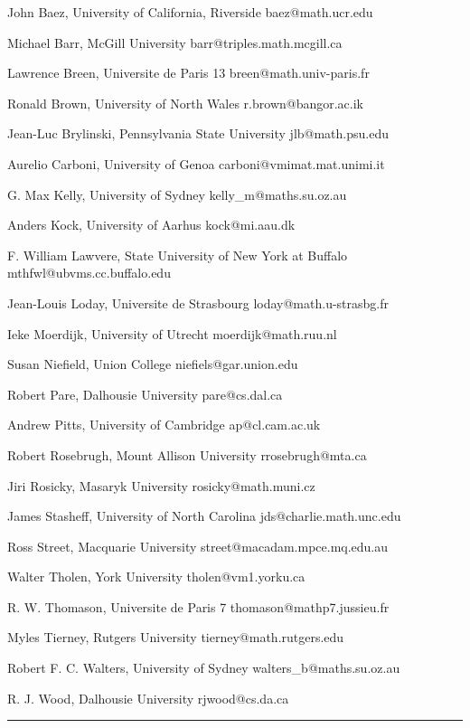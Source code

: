 John Baez, University of California, Riverside
baez@math.ucr.edu
 
Michael Barr, McGill University
barr@triples.math.mcgill.ca
 
Lawrence Breen, Universite de Paris 13
breen@math.univ-paris.fr
 
Ronald Brown, University of North Wales 
r.brown@bangor.ac.ik
 
Jean-Luc Brylinski, Pennsylvania State University
jlb@math.psu.edu
 
Aurelio Carboni, University of Genoa
carboni@vmimat.mat.unimi.it
 
G. Max Kelly, University of Sydney
kelly_m@maths.su.oz.au
 
Anders Kock, University of Aarhus
kock@mi.aau.dk
 
F. William Lawvere, State University of New York at Buffalo
mthfwl@ubvms.cc.buffalo.edu
 
Jean-Louis Loday, Universite de Strasbourg
loday@math.u-strasbg.fr
 
Ieke Moerdijk, University of Utrecht
moerdijk@math.ruu.nl
 
Susan Niefield, Union College
niefiels@gar.union.edu
 
Robert Pare, Dalhousie University
pare@cs.dal.ca
 
Andrew Pitts, University of Cambridge
ap@cl.cam.ac.uk
 
Robert Rosebrugh, Mount Allison University
rrosebrugh@mta.ca
 
Jiri Rosicky, Masaryk University
rosicky@math.muni.cz
 
James Stasheff, University of North Carolina
jds@charlie.math.unc.edu
 
Ross Street, Macquarie University 
street@macadam.mpce.mq.edu.au
 
Walter Tholen, York University
tholen@vm1.yorku.ca
 
R. W. Thomason, Universite de Paris 7
thomason@mathp7.jussieu.fr
 
Myles Tierney, Rutgers University
tierney@math.rutgers.edu
 
Robert F. C. Walters, University of Sydney
walters_b@maths.su.oz.au
 
R. J. Wood, Dalhousie University
rjwood@cs.da.ca
$$
    
\par\noindent\rule{\textwidth}{0.4pt}

